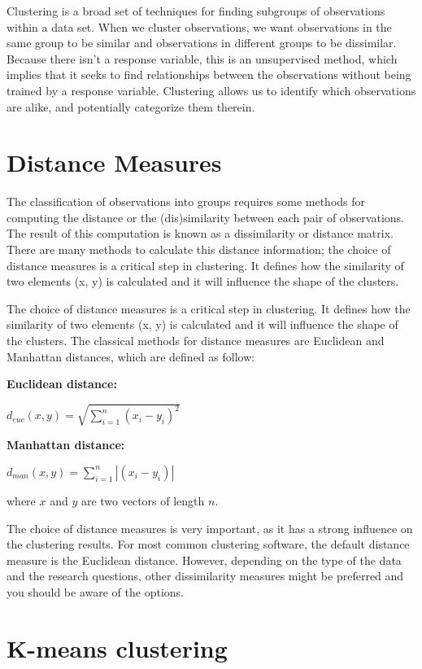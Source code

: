 \documentclass[
]{book}
\begin{document}
Clustering is a broad set of techniques for finding subgroups of observations within a data set. When we cluster observations, we want observations in the same group to be similar and observations in different groups to be dissimilar. Because there isn't a response variable, this is an unsupervised method, which implies that it seeks to find relationships between the observations without being trained by a response variable. Clustering allows us to identify which observations are alike, and potentially categorize them therein.

\hypertarget{distance-measures}{%
\section{Distance Measures}\label{distance-measures}}

The classification of observations into groups requires some methods for computing the distance or the (dis)similarity between each pair of observations. The result of this computation is known as a dissimilarity or distance matrix. There are many methods to calculate this distance information; the choice of distance measures is a critical step in clustering. It defines how the similarity of two elements (x, y) is calculated and it will influence the shape of the clusters.

The choice of distance measures is a critical step in clustering. It defines how the similarity of two elements (x, y) is calculated and it will influence the shape of the clusters. The classical methods for distance measures are Euclidean and Manhattan distances, which are defined as follow:

\textbf{Euclidean distance:}

\(d_{euc}(x,y) = \sqrt{\sum^n_{i=1}(x_i - y_i)^2}\)

\textbf{Manhattan distance:}

\(d_{man}(x,y) = \sum^n_{i=1}|(x_i - y_i)|\)

where \(x\) and \(y\) are two vectors of length \(n\).

The choice of distance measures is very important, as it has a strong influence on the clustering results. For most common clustering software, the default distance measure is the Euclidean distance. However, depending on the type of the data and the research questions, other dissimilarity measures might be preferred and you should be aware of the options.

\hypertarget{k-means-clustering}{%
\section{K-means clustering}\label{k-means-clustering}}
\end{document}
